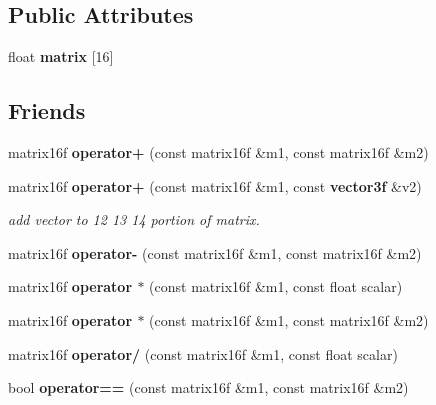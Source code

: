 \subsection*{Public Attributes}
\begin{CompactItemize}
\item 
{}
float {\bf matrix} [16]\label{classmatrix16f_m0}

\end{CompactItemize}
\subsection*{Friends}
\begin{CompactItemize}
\item 
{}
matrix16f {\bf operator+} (const matrix16f \&m1, const matrix16f \&m2)\label{classmatrix16f_l0}

\item 
{}
matrix16f {\bf operator+} (const matrix16f \&m1, const {\bf vector3f} \&v2)\label{classmatrix16f_l1}

\begin{CompactList}\small\item\em add vector to 12 13 14 portion of matrix.\item\end{CompactList}\item 
{}
matrix16f {\bf operator-} (const matrix16f \&m1, const matrix16f \&m2)\label{classmatrix16f_l2}

\item 
{}
matrix16f {\bf operator $\ast$} (const matrix16f \&m1, const float scalar)\label{classmatrix16f_l3}

\item 
{}
matrix16f {\bf operator $\ast$} (const matrix16f \&m1, const matrix16f \&m2)\label{classmatrix16f_l4}

\item 
{}
matrix16f {\bf operator/} (const matrix16f \&m1, const float scalar)\label{classmatrix16f_l5}

\item 
{}
bool {\bf operator==} (const matrix16f \&m1, const matrix16f \&m2)\label{classmatrix16f_l6}

\end{CompactItemize}


